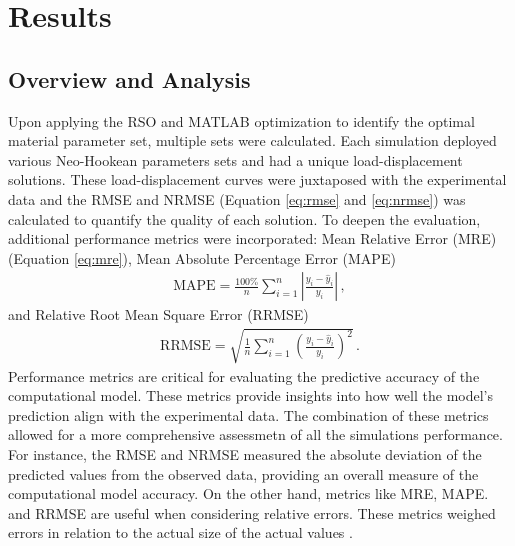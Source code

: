 
\chapter{Results} %
\label{chapter:results} %

\section{Overview and Analysis}
Upon applying the RSO and MATLAB optimization to identify the optimal material parameter set, 
multiple sets were calculated. 
Each simulation deployed various Neo-Hookean parameters sets and 
had a unique load-displacement solutions. These load-displacement curves were 
juxtaposed with the experimental data and the RMSE and NRMSE (Equation \ref{eq:rmse} and \ref{eq:nrmse}) was calculated to quantify the quality 
of each solution. To deepen the evaluation, additional performance metrics were incorporated: 
Mean Relative Error (MRE) (Equation \ref{eq:mre}), Mean Absolute Percentage Error (MAPE)
\begin{align}
    \text{MAPE} = \frac{100\%}{n} \sum_{i=1}^{n} \left| \frac{y_i - \hat{y}_i}{y_i} \right| \,,
\end{align}
and  Relative Root Mean Square Error (RRMSE)  
\begin{align}
    \text{RRMSE} = \sqrt{\frac{1}{n} \sum_{i=1}^{n} \left( \frac{y_i - \hat{y}_i}{y_i} \right)^2} \,.
\end{align}
Performance metrics are critical for evaluating the predictive accuracy of the computational model.
These metrics provide insights into how well the model's prediction align with the 
experimental data. The combination of these metrics allowed for a more comprehensive 
assessmetn of all the simulations performance. For instance, the RMSE and NRMSE measured the
absolute deviation of the predicted values from the observed data, providing an overall 
measure of the computational model accuracy. On the other hand, metrics like MRE, MAPE. and 
RRMSE are useful when considering relative errors. These metrics weighed errors in relation
to the actual size of the actual values \cite{Rajagukguk2020}.\\

